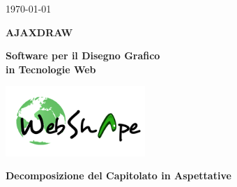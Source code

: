 \usepackage{multirow}


\renewcommand{\insertversion}{1.0} %
\renewcommand{\TITOLODOC}{Decomposizione del Capitolato in Aspettative} %

\begin{titlepage}
\begin{center}
	\begin{Large}	\today \end{Large}
\end{center}

\vspace{20pt}

\begin{center}
	\begin{Huge}
				\textbf{AJAXDRAW}
	\end{Huge}
\end{center}			

\begin{center}
	\begin{large}
				\textbf{Software per il Disegno Grafico\\ in Tecnologie Web}
	\end{large}
\end{center}			

\vspace{20pt}

\begin{center}
\includegraphics[width=150pt]{logo}
\end{center}

\vspace{160pt}
\begin{center} %
	\begin{Huge}
				\textbf{\TITOLODOC}
	\end{Huge}
			\\
\end{center}
\vspace{100pt}
\begin{center}
\end{center}
\end{titlepage}

